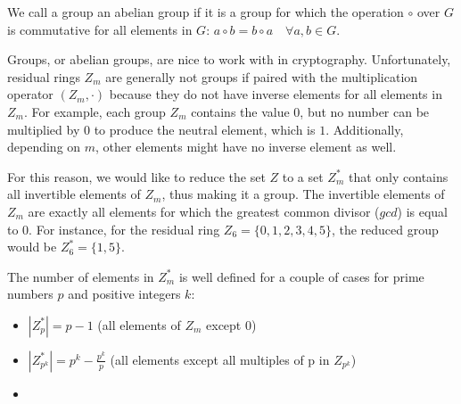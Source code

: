 We call a group an abelian group if it is a group for which the operation $\circ$ over $G$ is commutative for all elements in $G$:
$a \circ b = b \circ a \quad \forall a,b \in G$.

Groups, or abelian groups, are nice to work with in cryptography.
Unfortunately, residual rings $Z_m$ are generally not groups if paired with the multiplication operator $(Z_m,\cdot)$ because they do not have inverse elements for all elements in $Z_m$. For example, each group $Z_m$ contains the value $0$, but no number can be multiplied by $0$ to produce the neutral element, which is $1$.
Additionally, depending on $m$, other elements might have no inverse element as well.

For this reason, we would like to reduce the set $Z$ to a set $Z_m^*$ that only contains all invertible elements of $Z_m$, thus making it a group.
The invertible elements of $Z_m$ are exactly all elements for which the greatest common divisor ($gcd$) is equal to $0$.
For instance, for the residual ring $Z_6 = \{0, 1, 2, 3, 4, 5\}$, the reduced group would be $Z_6^* = \{1, 5 \}$.

The number of elements in $Z_m^*$ is well defined for a couple of cases for prime numbers $p$ and positive integers $k$:

\begin{itemize}
    \item $|Z_p^*| = p-1$ (all elements of $Z_m$ except $0$)
    \item $|Z_{p^k}^*| = p^k - \frac{p^k}{p}$ (all elements except all multiples of p in $Z_{p^k}$)
    \item %
\end{itemize}

